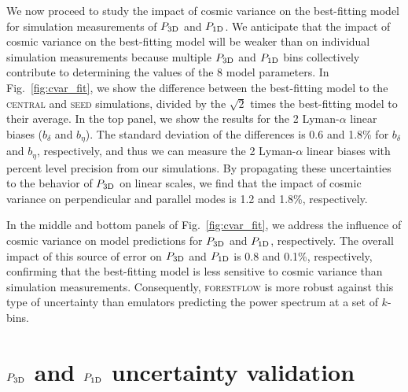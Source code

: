 \documentclass{aa}
\newcommand{\lya}{Lyman-$\alpha$\xspace}
\newcommand{\poned}{\ensuremath{P_{\rm 1D}}\xspace}
\newcommand{\pthreed}{\ensuremath{P_{\rm 3D}}\xspace}
\newcommand{\forestflow}{\textsc{forestflow}\xspace}
\newcommand{\simseed}{\textsc{seed}\xspace}
\newcommand{\simcentral}{\textsc{central}\xspace}
\begin{document}
\begin{appendix}
We now proceed to study the impact of cosmic variance on the best-fitting model for simulation measurements of \pthreed and \poned. We anticipate that the impact of cosmic variance on the best-fitting model will be weaker than on individual simulation measurements because multiple \pthreed and \poned bins collectively contribute to determining the values of the 8 model parameters. In Fig.~\ref{fig:cvar_fit}, we show the difference between the best-fitting model to the \simcentral and \simseed simulations, divided by the $\sqrt{2}$ times the best-fitting model to their average. In the top panel, we show the results for the 2 \lya linear biases ($b_\delta$ and $b_\eta$). The standard deviation of the differences is 0.6 and 1.8\% for $b_\delta$ and $b_\eta$, respectively, and thus we can measure the 2 \lya linear biases with percent level precision from our simulations. By propagating these uncertainties to the behavior of \pthreed on linear scales, we find that the impact of cosmic variance on perpendicular and parallel modes is 1.2 and 1.8\%, respectively. 

In the middle and bottom panels of Fig.~\ref{fig:cvar_fit}, we address the influence of cosmic variance on model predictions for \pthreed and \poned, respectively. The overall impact of this source of error on \pthreed and \poned is 0.8 and 0.1\%, respectively, confirming that the best-fitting model is less sensitive to cosmic variance than simulation measurements. Consequently, \forestflow is more robust against this type of uncertainty than emulators predicting the power spectrum at a set of $k$-bins.



\section{\pthreed and \poned uncertainty validation}
\label{sec:uncertainty_validation}


\end{appendix}
\end{document}
